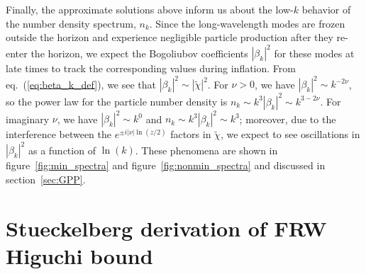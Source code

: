 \documentclass[11pt,a4paper]{article}
\newcommand{\fref}[1]{figure~\ref{#1}}
\newcommand{\sref}[1]{section~\ref{#1}}
\newcommand{\eref}[1]{eq.~(\ref{#1})}
\begin{document}
\begin{appendix}
Finally, the approximate solutions above inform us about the low-$k$ behavior of the number density spectrum, $n_k$.  Since the long-wavelength modes are frozen outside the horizon and experience negligible particle production after they re-enter the horizon, we expect the Bogoliubov coefficients $| \beta_k |^2$ for these modes at late times to track the corresponding values during inflation.   From \eref{eq:beta_k_def}, we see that $| \beta_k |^2 \sim | \tilde{\chi} |^2$. For \(\nu > 0\), we have $ |\beta_k |^2 \sim k^{-2\nu} $, so the power law for the particle number density is \(n_k \sim k^3 |\beta_k |^2 \sim k^{3-2\nu}\).  For imaginary \(\nu\), we have $ |\beta_k |^2 \sim k^{0} $ and $n_k \sim k^3 |\beta_k|^2 \sim k^{3}$; moreover, due to the interference between the \(e^{\pm i|\nu| \ln(z/2)}\) factors in $\tilde{\chi}$, we expect to see oscillations in \(|\beta_k|^2\) as a function of \(\ln(k)\).  These phenomena are shown in \fref{fig:min_spectra} and \fref{fig:nonmin_spectra} and discussed in \sref{sec:GPP}.

\section{Stueckelberg derivation of FRW Higuchi bound}
\label{app:stueck}


\end{appendix}
\end{document}
